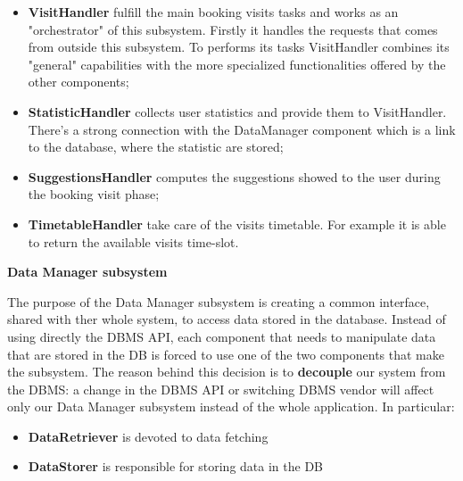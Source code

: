 \documentclass[]{article}
\begin{document}
	\begin{itemize}
		\item \textbf{VisitHandler} fulfill the main booking visits tasks and works as an "orchestrator" of this subsystem.
		Firstly it handles the requests that comes from outside this subsystem. To performs its tasks VisitHandler combines its "general" capabilities with the more specialized functionalities offered by the other components;
		\item \textbf{StatisticHandler} collects user statistics and provide them to VisitHandler. There's a strong connection with the DataManager component which is a link to the database, where the statistic are stored;
		\item \textbf{SuggestionsHandler} computes the suggestions showed to the user during the booking visit phase;
		\item \textbf{TimetableHandler} take care of the visits timetable. For example it is able to return the available visits time-slot.
	\end{itemize}
	

	

		\bigskip\bigskip
		
		\textbf{Data Manager subsystem} \newline
		
		The purpose of the Data Manager subsystem is creating a common interface, shared with ther whole system, to access data stored in the database. \newline
		Instead of using directly the DBMS API, each component that needs to manipulate data that are stored in the DB is forced to use one of the two components that make the subsystem. \newline
		The reason behind this decision is to \textbf{decouple} our system from the DBMS: a change in the DBMS API or switching DBMS vendor will affect only our Data Manager subsystem instead of the whole application. \newline
		In particular:
		
		\begin{itemize}
		
			\item \textbf{DataRetriever} is devoted to data fetching
			\item \textbf{DataStorer} is responsible for storing data in the DB
		\end{itemize}
		
\end{document}

